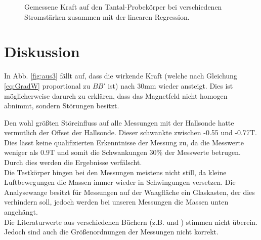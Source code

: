 \documentclass[12pt,a4paper,titlepage,headinclude,bibtotoc]{scrartcl}
\begin{document}
\begin{figure}[h]
\centering
{}
\caption{Gemessene Kraft auf den Tantal-Probekörper bei verschiedenen Stromstärken zusammen mit der linearen Regression.}
\label{fig:aus7}
\end{figure}

\section{Diskussion}
\label{sec:diskussion}
In Abb. \ref{fig:aus3} fällt auf, dass die wirkende Kraft (welche nach Gleichung \eqref{eq:GradW} proportional zu $BB'$ ist) nach 30mm wieder ansteigt.
Dies ist möglicherweise darurch zu erklären, dass das Magnetfeld nicht homogen abnimmt, sondern Störungen besitzt.

Den wohl größten Störeinfluss auf alle Messungen mit der Hallsonde hatte vermutlich der Offset der Hallsonde.
Dieser schwankte zwischen -0.55 und -0.77T.
Dies lässt keine qualifizierten Erkenntnisse der Messung zu, da die Messwerte weniger als 0.9T und somit die Schwankungen 30\% der Messwerte betrugen.\\
Durch dies werden die Ergebnisse verfälscht.\\

Die Testkörper hingen bei den Messungen meistens nicht still, da kleine Luftbewegungen die Massen immer wieder in Schwingungen versetzen.
Die Analysewaage besitzt für Messungen auf der Waagfläche ein Glaskasten, der dies verhindern soll, jedoch werden bei unseren Messungen die Massen unten angehängt.\\

Die Literaturwerte aus verschiedenen Büchern (z.B. \cite{gerthsen} und \cite{taschenbuch}) stimmen nicht überein.
Jedoch sind auch die Größenordnungen der Messungen nicht korrekt.
\newpage


\end{document}
